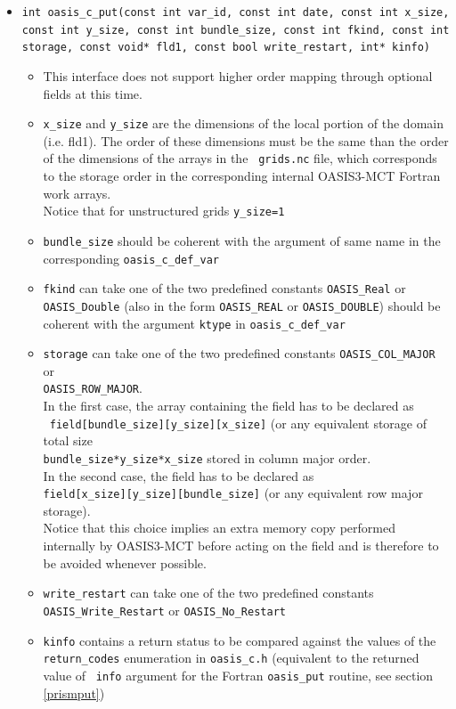 \begin{itemize}
\vspace{0.2cm}
\item {\tt int oasis\_c\_put(const int var\_id, const int date, const
  int x\_size, const int y\_size, const int bundle\_size, const int
  fkind, const int storage, const void* fld1, const bool
  write\_restart, int* kinfo)}
  \begin{itemize}
  \item This interface does not support higher order mapping through optional fields at this time.
  \item {\tt x\_size} and {\tt y\_size} are the dimensions of the local
    portion of the domain (i.e. fld1). The order of these dimensions must be the same than the order of the dimensions of the arrays in the {\tt
      grids.nc} file, which corresponds to the storage order in the
    corresponding internal OASIS3-MCT Fortran work arrays. \\
    Notice that for
    unstructured grids {\tt y\_size=1}
  \item {\tt bundle\_size} should be coherent with the argument of
    same name in the corresponding {\tt oasis\_c\_def\_var}
  \item {\tt fkind} can take one of the two predefined constants
    {\tt OASIS\_Real} or {\tt OASIS\_Double} (also in the form
    {\tt OASIS\_REAL} or {\tt OASIS\_DOUBLE}) should be coherent with
    the argument {\tt ktype} in {\tt oasis\_c\_def\_var}
  \item {\tt storage} can take one of the two predefined constants
    {\tt OASIS\_COL\_MAJOR} or \\
    {\tt OASIS\_ROW\_MAJOR}. \\
    In the first
    case, the array containing the field has to be declared as \\ {\tt
      field[bundle\_size][y\_size][x\_size]} (or any equivalent
    storage of total size \\
    {\tt bundle\_size*y\_size*x\_size} stored in
    column major order. \\
    In the second case, the field has to be
    declared as \\
    {\tt field[x\_size][y\_size][bundle\_size]} (or any
    equivalent row major storage). \\
    Notice that this choice implies an
    extra memory copy performed internally by OASIS3-MCT before acting on
    the field and is therefore to be avoided whenever possible.
  \item {\tt write\_restart} can take one of the two predefined constants
    {\tt OASIS\_Write\_Restart} or {\tt OASIS\_No\_Restart}
  \item {\tt kinfo} contains a return status to be compared against
    the values of the {\tt return\_codes} enumeration in {\tt oasis\_c.h} (equivalent to the returned value of {\tt
  info} argument for the Fortran {\tt oasis\_put} routine, see section \ref{prismput})
  \end{itemize}


\end{itemize}
